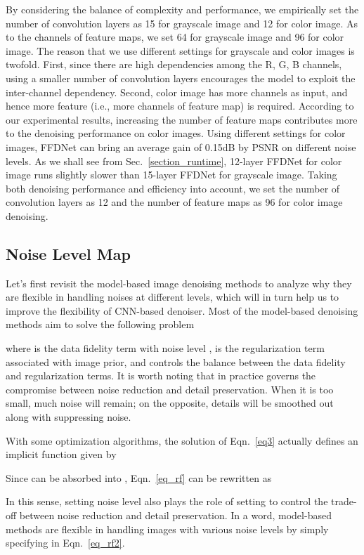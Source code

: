 \documentclass[journal]{IEEEtran}
\begin{document}
By considering the balance of complexity and performance, we empirically set the number of convolution layers as 15 for grayscale image and 12 for color image. As to the channels of feature maps, we set 64 for grayscale image and 96 for color image. The reason that we use different settings for grayscale and color images is twofold.
First, since there are high dependencies among the R, G, B channels, using a smaller number of convolution layers encourages the model to exploit the inter-channel dependency.
Second, color image has more channels as input, and hence more feature (i.e., more channels of feature map) is required.
According to our experimental results, increasing the number of feature maps contributes more to the denoising performance on color images. Using different settings for color images, FFDNet can bring an average gain of 0.15dB by PSNR on different noise levels.
As we shall see from Sec.~\ref{section_runtime}, 12-layer FFDNet for color image runs slightly slower than 15-layer FFDNet for grayscale image. Taking both denoising performance and efficiency into account, we set the number of convolution layers as 12 and the number of feature maps as 96 for color image denoising.

\subsection{Noise Level Map}
Let's first revisit the model-based image denoising methods to analyze why they are flexible in handling noises at different levels, which will in turn help us to improve the flexibility of CNN-based denoiser. Most of the model-based denoising methods aim to solve the following problem

where  is the data fidelity term with noise level ,
 is the regularization term associated with image prior, and  controls the balance between the data fidelity and regularization terms. It is worth noting that in practice  governs the compromise between noise reduction and detail preservation. When it is too small, much noise will remain; on the opposite, details will be smoothed out along with suppressing noise.


{With some optimization algorithms, the solution of Eqn.~\eqref{eq3} actually defines an implicit function given by

Since  can be absorbed into , Eqn.~\eqref{eq_rf} can be rewritten as
}
In this sense, setting noise level  also plays the role of setting  to control the trade-off between noise reduction and detail preservation. In a word, model-based methods are flexible in handling images with various noise levels by simply specifying  in Eqn.~\eqref{eq_rf2}.
\end{document}

